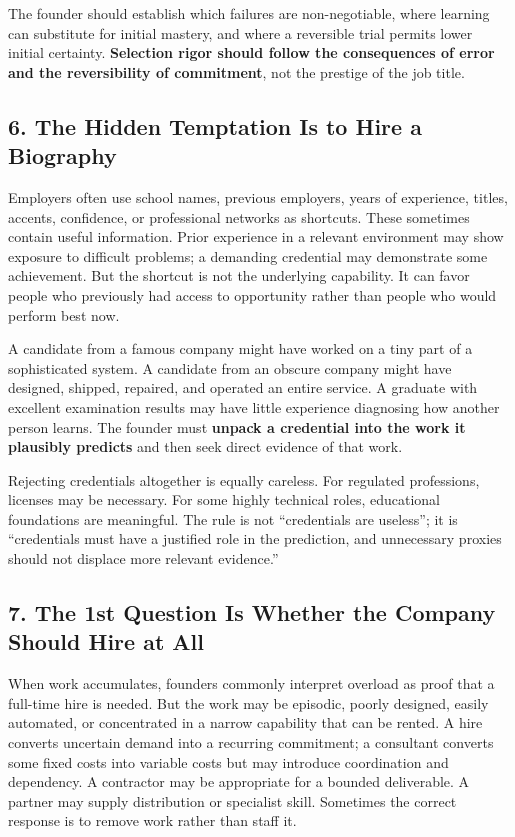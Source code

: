 The founder should establish which failures are non-negotiable, where learning can substitute for initial mastery, and where a reversible trial permits lower initial certainty. \textbf{Selection rigor should follow the consequences of error and the reversibility of commitment}, not the prestige of the job title.

\subsection*{6. The Hidden Temptation Is to Hire a Biography}

Employers often use school names, previous employers, years of experience, titles, accents, confidence, or professional networks as shortcuts. These sometimes contain useful information. Prior experience in a relevant environment may show exposure to difficult problems; a demanding credential may demonstrate some achievement. But the shortcut is not the underlying capability. It can favor people who previously had access to opportunity rather than people who would perform best now.

A candidate from a famous company might have worked on a tiny part of a sophisticated system. A candidate from an obscure company might have designed, shipped, repaired, and operated an entire service. A graduate with excellent examination results may have little experience diagnosing how another person learns. The founder must \textbf{unpack a credential into the work it plausibly predicts} and then seek direct evidence of that work.

Rejecting credentials altogether is equally careless. For regulated professions, licenses may be necessary. For some highly technical roles, educational foundations are meaningful. The rule is not ``credentials are useless''; it is ``credentials must have a justified role in the prediction, and unnecessary proxies should not displace more relevant evidence.''

\subsection*{7. The 1st Question Is Whether the Company Should Hire at All}

When work accumulates, founders commonly interpret overload as proof that a full-time hire is needed. But the work may be episodic, poorly designed, easily automated, or concentrated in a narrow capability that can be rented. A hire converts uncertain demand into a recurring commitment; a consultant converts some fixed costs into variable costs but may introduce coordination and dependency. A contractor may be appropriate for a bounded deliverable. A partner may supply distribution or specialist skill. Sometimes the correct response is to remove work rather than staff it.


